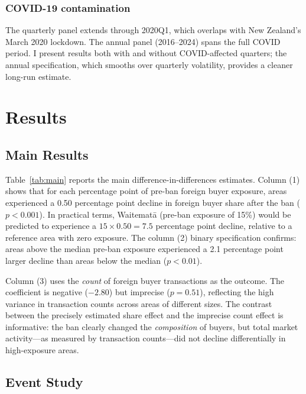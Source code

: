 \documentclass[12pt]{article}
\begin{document}
\subsubsection*{COVID-19 contamination} The quarterly panel extends through 2020Q1, which overlaps with New Zealand's March 2020 lockdown. The annual panel (2016--2024) spans the full COVID period. I present results both with and without COVID-affected quarters; the annual specification, which smooths over quarterly volatility, provides a cleaner long-run estimate.

\section{Results}

\subsection{Main Results}



Table~\ref{tab:main} reports the main difference-in-differences estimates. Column (1) shows that for each percentage point of pre-ban foreign buyer exposure, areas experienced a 0.50 percentage point decline in foreign buyer share after the ban ($p < 0.001$). In practical terms, Waitemat\=a (pre-ban exposure of 15\%) would be predicted to experience a $15 \times 0.50 = 7.5$ percentage point decline, relative to a reference area with zero exposure. The column (2) binary specification confirms: areas above the median pre-ban exposure experienced a 2.1 percentage point larger decline than areas below the median ($p < 0.01$).

Column (3) uses the \emph{count} of foreign buyer transactions as the outcome. The coefficient is negative ($-2.80$) but imprecise ($p = 0.51$), reflecting the high variance in transaction counts across areas of different sizes. The contrast between the precisely estimated share effect and the imprecise count effect is informative: the ban clearly changed the \emph{composition} of buyers, but total market activity---as measured by transaction counts---did not decline differentially in high-exposure areas.

\subsection{Event Study}


\end{document}
